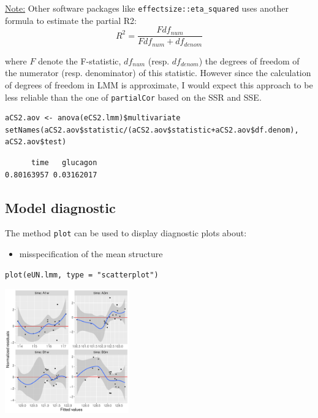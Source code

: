 \documentclass[12pt]{article}
\begin{document}
\bigskip

\uline{Note:} Other software packages like \texttt{effectsize::eta\_squared} uses
another formula to estimate the partial R2:
\[ R^2=\frac{F df_{num}}{F df_{num} + df_{denom}} \]

where \(F\) denote the F-statistic, \(df_{num}\)
(resp. \(df_{denom}\)) the degrees of freedom of the numerator
(resp. denominator) of this statistic. However since the calculation
of degrees of freedom in LMM is approximate, I would expect this
approach to be less reliable than the one of \texttt{partialCor} based on the
SSR and SSE.

\lstset{language=r,label= ,caption= ,captionpos=b,numbers=none}
\begin{lstlisting}
aCS2.aov <- anova(eCS2.lmm)$multivariate
setNames(aCS2.aov$statistic/(aCS2.aov$statistic+aCS2.aov$df.denom), aCS2.aov$test)
\end{lstlisting}

\begin{verbatim}
      time   glucagon 
0.80163957 0.03162017
\end{verbatim}



\bigskip


\clearpage

\subsection{Model diagnostic}
\label{sec:orgbe015fe}

The method \texttt{plot} can be used to display diagnostic plots about:
\begin{itemize}
\item misspecification of the mean structure
\end{itemize}
\lstset{language=r,label= ,caption= ,captionpos=b,numbers=none}
\begin{lstlisting}
plot(eUN.lmm, type = "scatterplot")
\end{lstlisting}

\begin{center}
\includegraphics[width=0.4\textwidth]{./figures/diag-scatterplot.pdf}
\end{center}
\end{document}
